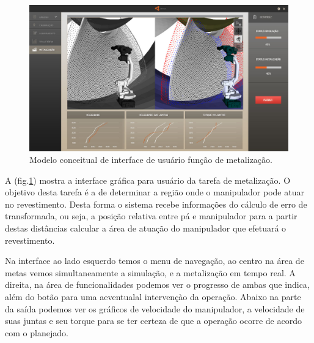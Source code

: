 \documentclass[12pt,a4paper]{article}
\begin{document}
\begin{figure}[H]
\begin{center}
  \includegraphics[width=\columnwidth]{figs/Execucao.jpg}
  \caption{Modelo conceitual de interface de usuário função de metalização.}
  \label{fig:Interface_execucao}
\end{center}
\end{figure} 

A (fig.\ref{fig:Interface_execucao}) mostra a interface gráfica para usuário
da tarefa de metalização. O objetivo desta tarefa é a de determinar a região
onde o manipulador pode atuar no revestimento. Desta forma o sistema recebe
informações do cálculo de erro de transformada, ou seja, a posição relativa
entre pá e manipulador para a partir destas distâncias calcular a área de
atuação do manipulador que efetuará o revestimento.

Na interface ao lado esquerdo temos o menu de navegação, ao centro na área de
metas vemos simultaneamente a simulação, e a metalização em tempo real. A
direita, na área de funcionalidades podemos ver o progresso de ambas que
indica, além do botão para uma aeventualal intervençào da operação.
Abaixo na parte da saída podemos ver os gráficos de velocidade do manipulador, a
velocidade de suas juntas e seu torque para se ter certeza de que a operação
ocorre de acordo com o planejado.



 
\end{document}
